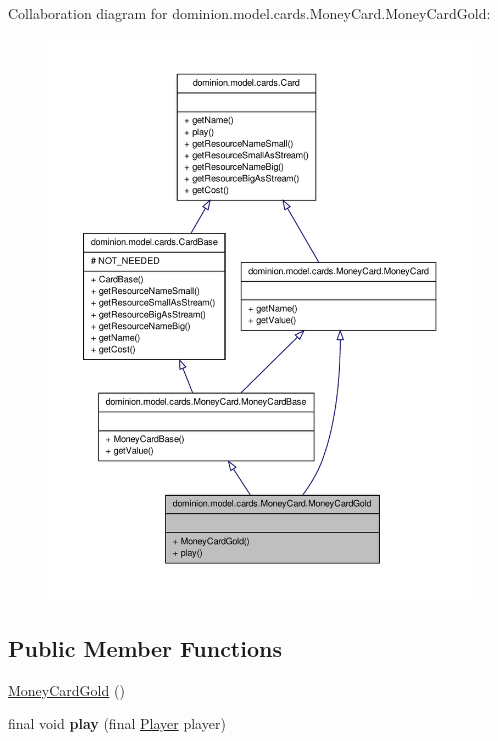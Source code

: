 \-Collaboration diagram for dominion.\-model.\-cards.\-Money\-Card.\-Money\-Card\-Gold\-:
\nopagebreak
\begin{figure}[H]
\begin{center}
\leavevmode
\includegraphics[width=350pt]{classdominion_1_1model_1_1cards_1_1MoneyCard_1_1MoneyCardGold__coll__graph}
\end{center}
\end{figure}
\subsection*{\-Public \-Member \-Functions}
\begin{DoxyCompactItemize}
\item 
\hyperlink{classdominion_1_1model_1_1cards_1_1MoneyCard_1_1MoneyCardGold_aeee793ffa02b95fc83c9c826058c4985}{\-Money\-Card\-Gold} ()
\item 
\hypertarget{classdominion_1_1model_1_1cards_1_1MoneyCard_1_1MoneyCardGold_a9349b97bde3a612574b813fd5b464f43}{final void {\bfseries play} (final \hyperlink{interfacedominion_1_1model_1_1Player}{\-Player} player)}\label{classdominion_1_1model_1_1cards_1_1MoneyCard_1_1MoneyCardGold_a9349b97bde3a612574b813fd5b464f43}

\end{DoxyCompactItemize}


